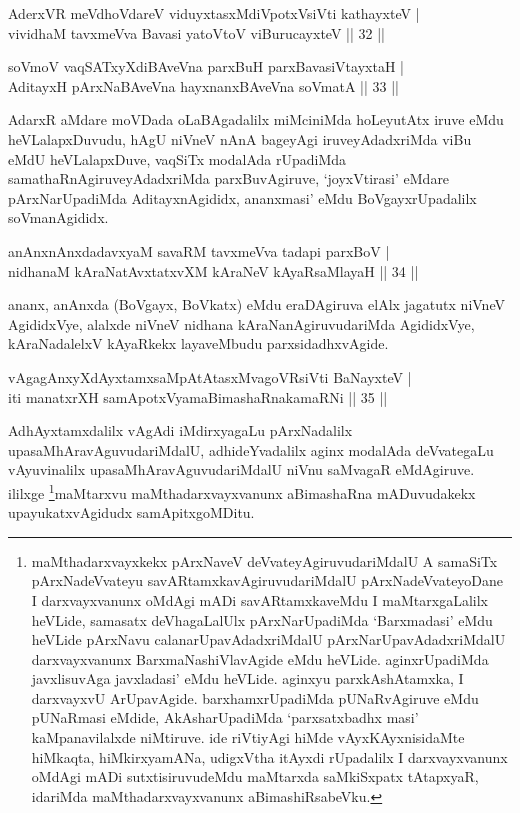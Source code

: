 \begin{shl}
AderxVR meVdhoVdareV viduyxtasxMdiVpotxV\s siVti kathayxteV | \\
vividhaM tavxmeVva Bavasi yatoV\s toV viBurucayxteV \hfill|| 32 || 
\end{shl}

\begin{shl}
soVmoV vaqSATxyXdiBAveVna parxBuH parxBavasiVtayxtaH | \\
AditayxH pArxNaBAveVna hayxnanxBAveVna soVmatA \hfill|| 33 || 
\end{shl}

\begin{artha}
AdarxR aMdare moVDada oLaBAgadalilx miMciniMda hoLeyutAtx iruve eMdu heVLalapxDuvudu, hAgU niVneV nAnA bageyAgi iruveyAdadxriMda viBu eMdU heVLalapxDuve, vaqSiTx modalAda rUpadiMda samathaRnAgiruveyAdadxriMda parxBuvAgiruve, `joyxVtirasi' eMdare pArxNarUpadiMda AditayxnAgididx, ananxmasi' eMdu BoVgayxrUpadalilx soVmanAgididx.
\end{artha}

\begin{shl}
anAnxnAnxdadavxyaM savaRM tavxmeVva tadapi parxBoV | \\
nidhanaM kAraNatAvxtatxvXM kAraNeV kAyaRsaMlayaH \hfill|| 34 || 
\end{shl}

\begin{artha}
ananx, anAnxda (BoVgayx, BoVkatx) eMdu eraDAgiruva elAlx jagatutx niVneV AgididxVye, alalxde niVneV nidhana kAraNanAgiruvudariMda AgididxVye, kAraNadalelxV kAyaRkekx layaveMbudu parxsidadhxvAgide.
\end{artha}

\begin{shl}
vAgagAnxyXdAyxtamxsaMpAtAtasxMvagoVR\s siVti BaNayxteV | \\
iti manatxrXH samApotxV\s yamaBimashaRnakamaRNi \hfill|| 35 || 
\end{shl}

\begin{artha}
AdhAyxtamxdalilx vAgAdi iMdirxyagaLu pArxNadalilx upasaMhAravAguvudariMda\-lU, adhideYvadalilx aginx modalAda deVvategaLu vAyuvinalilx upasaMhAravAgu\-vudariMdalU niVnu saMvagaR eMdAgiruve. ililxge \footnote{maMthadarxvayxkekx pArxNaveV deVvateyAgiruvudariMdalU A samaSiTx pArxNadeVvateyu savARtamxka\-vAgiruvudariMdalU pArxNadeVvateyoDane I darxvayxvanunx oMdAgi mADi savARtamxkaveMdu I maMtarxgaLalilx heVLide, samasatx deVhagaLalUlx pArxNarUpadiMda `Barxmadasi' eMdu heVLide pArxNavu calanarUpavAdadxriMdalU pArxNarUpavAdadxriMdalU darxvayxvanunx BarxmaNashiVlavAgide eMdu heVLide. aginxrUpadiMda javxlisuvAga javxladasi' eMdu heVLide. aginxyu parxkAshAtamxka, I darxvayxvU ArUpavAgide. barxhamxrUpadiMda pUNaRvAgiruve eMdu pUNaRmasi eMdide, AkAsharUpadiMda `parxsatxbadhx masi' kaMpanavilalxde niMtiruve. ide riVtiyAgi hiMde vAyxKAyxnisidaMte hiMkaqta, hiMkirxyamANa, udigxVtha itAyxdi rUpadalilx I darxvayxvanunx oMdAgi mADi sutxtisiruvudeMdu maMtarxda saMkiSxpatx tAtapxyaR, idariMda maMthadarxvayxvanunx aBimashiRsabeVku.}maMtarxvu maMthadarxvayxvanunx aBimashaRna mADuvudakekx upayukatxvAgidudx samApitxgoMDitu.
\end{artha}

